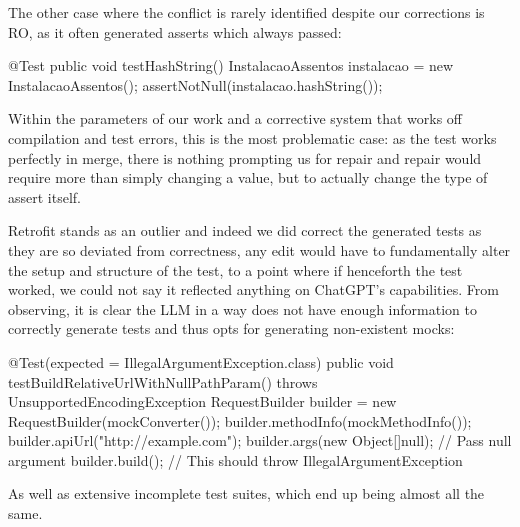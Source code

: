 The other case where the conflict is rarely identified despite our corrections is RO, as it often generated asserts which always passed:
\begin{response}
@Test
public void testHashString() {
    InstalacaoAssentos instalacao = new InstalacaoAssentos();
    assertNotNull(instalacao.hashString());
}
\end{response}
Within the parameters of our work and a corrective system that works off compilation and test errors, this is the most problematic case: as the test works perfectly in merge,
there is nothing prompting us for repair and repair would require more than simply changing a value, but to actually change the type of assert itself.

Retrofit stands as an outlier and indeed we did correct the generated tests as they are so deviated from correctness, any edit would have to fundamentally alter the setup and structure of the test,
to a point where if henceforth the test worked, we could not say it reflected anything on ChatGPT's capabilities.
From observing, it is clear the LLM in a way does not have enough information to correctly generate tests and thus opts for generating non-existent mocks:
\begin{response}
@Test(expected = IllegalArgumentException.class)
public void testBuildRelativeUrlWithNullPathParam() throws UnsupportedEncodingException {
    RequestBuilder builder = new RequestBuilder(mockConverter());
    builder.methodInfo(mockMethodInfo());
    builder.apiUrl("http://example.com");
    builder.args(new Object[]{null}); // Pass null argument
    builder.build(); // This should throw IllegalArgumentException
}
\end{response}
As well as extensive incomplete test suites, which end up being almost all the same.
